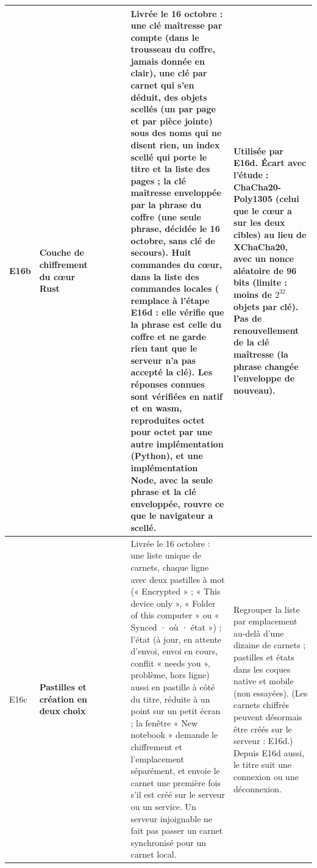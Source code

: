 \documentclass[10pt,a4paper]{article}
\newcommand{\etat}[1]{\colorbox{c#1}{\textcolor{white}{\scriptsize\textbf{\csname lbl#1\endcsname}}}}
\newcommand{\code}[1]{\texttt{\detokenize{#1}}}
\newcommand{\point}[5]{\stepcounter{n#3}#1 & \textbf{#2} & \etat{#3} & #4 & #5 \\ \midrule}
\begin{document}
{\begin{longtable}{@{}p{0.75cm} p{2.5cm} p{2.25cm} p{5.15cm} p{4.95cm}@{}}
\point{E16b}{Couche de chiffrement du c\oe ur Rust}{fait}{Livrée le 16 octobre : une clé maîtresse par compte (dans le trousseau du coffre, jamais donnée en clair), une clé par carnet qui s'en déduit, des objets scellés (un par page et par pièce jointe) sous des noms qui ne disent rien, un index scellé qui porte le titre et la liste des pages ; la clé maîtresse enveloppée par la phrase du coffre (une seule phrase, décidée le 16 octobre, sans clé de secours). Huit commandes du c\oe ur, dans la liste des commandes locales (\code{seal:master:make} remplace \code{create} à l'étape E16d : elle vérifie que la phrase est celle du coffre et ne garde rien tant que le serveur n'a pas accepté la clé). Les réponses connues sont vérifiées en natif et en wasm, reproduites octet pour octet par une autre implémentation (Python), et une implémentation Node, avec la seule phrase et la clé enveloppée, rouvre ce que le navigateur a scellé.}{Utilisée par E16d. Écart avec l'étude : ChaCha20-Poly1305 (celui que le c\oe ur a sur les deux cibles) au lieu de XChaCha20, avec un nonce aléatoire de 96 bits (limite : moins de $2^{32}$ objets par clé). Pas de renouvellement de la clé maîtresse (la phrase changée l'enveloppe de nouveau).}
\point{E16c}{Pastilles et création en deux choix}{fait}{Livrée le 16 octobre : une liste unique de carnets, chaque ligne avec deux pastilles à mot (« Encrypted » ; « This device only », « Folder of this computer » ou « Synced · où · état ») ; l'état (à jour, en attente d'envoi, envoi en cours, conflit « needs you », problème, hors ligne) aussi en pastille à côté du titre, réduite à un point sur un petit écran ; la fenêtre « New notebook » demande le chiffrement et l'emplacement séparément, et envoie le carnet une première fois s'il est créé sur le serveur ou un service. Un serveur injoignable ne fait pas passer un carnet synchronisé pour un carnet local.}{Regrouper la liste par emplacement au-delà d'une dizaine de carnets ; pastilles et états dans les coques native et mobile (non essayées). (Les carnets chiffrés peuvent désormais être créés sur le serveur : E16d.) Depuis E16d aussi, le titre suit une connexion ou une déconnexion.}

\end{longtable}}
\end{document}

